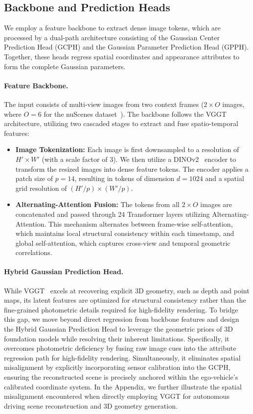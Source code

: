 \subsection{Backbone and Prediction Heads}
\label{sec:method-gs}
We employ a feature backbone to extract dense image tokens, which are processed by a dual-path architecture consisting of the Gaussian Center Prediction Head (GCPH) and the Gaussian Parameter Prediction Head (GPPH). Together, these heads regress spatial coordinates and appearance attributes to form the complete Gaussian parameters.

\paragraph{Feature Backbone.}
The input consists of multi-view images from two context frames ($2\times O$ images, where $O=6$ for the nuScenes dataset~\cite{caesar2020nuscenes}). The backbone follows the VGGT~\cite{wang2025vggt} architecture, utilizing two cascaded stages to extract and fuse spatio-temporal features:
\begin{itemize}[leftmargin=9pt]
    \item \textbf{Image Tokenization:} Each image is first downsampled to a resolution of $H' \times W'$ (with a scale factor of 3). We then utilize a DINOv2~\cite{oquab2023dinov2} encoder to transform the resized images into dense feature tokens. The encoder applies a patch size of $p=14$, resulting in tokens of dimension $d=1024$ and a spatial grid resolution of $(H' / p) \times (W' / p)$.
    \item \textbf{Alternating-Attention Fusion:} The tokens from all $2 \times O$ images are concatenated and passed through 24 Transformer layers utilizing Alternating-Attention. This mechanism alternates between frame-wise self-attention, which maintains local structural consistency within each timestamp, and global self-attention, which captures cross-view and temporal geometric correlations.
\end{itemize}

\paragraph{Hybrid Gaussian Prediction Head.} While VGGT~\cite{wang2025vggt} excels at recovering explicit 3D geometry, such as depth and point maps, its latent features are optimized for structural consistency rather than the fine-grained photometric details required for high-fidelity rendering. To bridge this gap, we move beyond direct regression from backbone features and design the Hybrid Gaussian Prediction Head to leverage the geometric priors of 3D foundation models while resolving their inherent limitations. Specifically, it overcomes photometric deficiency by fusing raw image cues into the attribute regression path for high-fidelity rendering. Simultaneously, it eliminates spatial misalignment by explicitly incorporating sensor calibration into the GCPH, ensuring the reconstructed scene is precisely anchored within the ego-vehicle’s calibrated coordinate system. In the Appendix, we further illustrate the spatial misalignment encountered when directly employing VGGT for autonomous driving scene reconstruction and 3D geometry generation.

